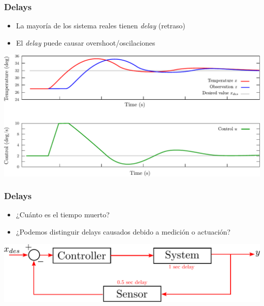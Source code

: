 \begin{frame}
    \frametitle{Delays}
    
    \begin{itemize}
        \item La mayoría de los sistema reales tienen \emph{delay} (retraso)
        \item El \emph{delay} puede causar overshoot/oscilaciones
    \end{itemize}
    
    \begin{center}
        \includegraphics[width=0.8\columnwidth]{images/pid_control_proportional_delay.pdf}
    \end{center}
    
\end{frame}

\begin{frame}
    \frametitle{Delays}
    
    \begin{itemize}
        \item ¿Cuánto es el tiempo muerto?
        \item ¿Podemos distinguir delays causados debido a medición o actuación?
    \end{itemize}
    
    \begin{center}
        \includegraphics[width=0.8\columnwidth]{images/feedback_control_with_delays.pdf}
    \end{center}
    
\end{frame}

